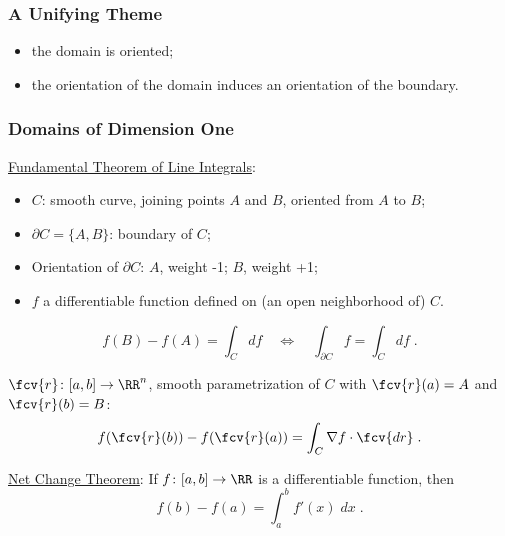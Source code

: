 \begin{frame}
  \frametitle{A Unifying Theme}

 \begin{center}
 \end{center}
\begin{itemize}
  \item the domain is oriented;
  \item the orientation of the domain induces an orientation of the boundary.
\end{itemize}


\end{frame}

\begin{frame}
  \frametitle{Domains of Dimension One}

\underline{Fundamental Theorem of Line Integrals}:
\begin{itemize}
  \item $C$: smooth curve, joining points $A$ and $B$, oriented from $A$ to $B$;
  \item $\partial C = \{A,B\}$: boundary of $C$;
  \item Orientation of $\partial C$: $A$, weight -1; $B$, weight +1;
  \item $f$ a differentiable function defined on (an open neighborhood of) $C$.
\end{itemize}
%
$$f(B)-f(A) =\int_C df \quad \Leftrightarrow \quad \int_{\partial C} f = \int_C df\;.$$

$\fcv{r} \colon [a,b] \to \RR^n$, smooth parametrization of $C$ with $\fcv{r}(a) = A$ and $\fcv{r}(b)=B$:
%
$$
  f(\fcv{r}(b)) - f(\fcv{r}(a)) = \int_C \nabla f \cdot  \fcv{dr}\; .
$$


\underline{Net Change Theorem}: If $f \colon [a,b] \to \RR$ is a differentiable function, then
%
$$
   f(b)-f(a) = \int_{a}^b f'(x) \; dx\; .
$$


\end{frame}

